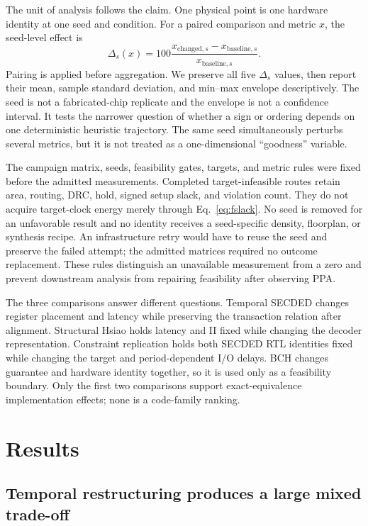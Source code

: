 \documentclass[conference,10pt]{IEEEtran}
\begin{document}
The unit of analysis follows the claim. One physical point is one hardware identity at one seed and condition. For a paired comparison and metric $x$, the seed-level effect is
\begin{equation}
 \Delta_s(x)=100\frac{x_{\mathrm{changed},s}-x_{\mathrm{baseline},s}}
 {x_{\mathrm{baseline},s}} .
 \label{eq:paired}
\end{equation}
Pairing is applied before aggregation. We preserve all five $\Delta_s$ values, then report their mean, sample standard deviation, and min--max envelope descriptively. The seed is not a fabricated-chip replicate and the envelope is not a confidence interval. It tests the narrower question of whether a sign or ordering depends on one deterministic heuristic trajectory. The same seed simultaneously perturbs several metrics, but it is not treated as a one-dimensional ``goodness'' variable.

The campaign matrix, seeds, feasibility gates, targets, and metric rules were fixed before the admitted measurements. Completed target-infeasible routes retain area, routing, DRC, hold, signed setup slack, and violation count. They do not acquire target-clock energy merely through Eq.~\eqref{eq:fslack}. No seed is removed for an unfavorable result and no identity receives a seed-specific density, floorplan, or synthesis recipe. An infrastructure retry would have to reuse the seed and preserve the failed attempt; the admitted matrices required no outcome replacement. These rules distinguish an unavailable measurement from a zero and prevent downstream analysis from repairing feasibility after observing PPA.

The three comparisons answer different questions. Temporal SECDED changes register placement and latency while preserving the transaction relation after alignment. Structural Hsiao holds latency and II fixed while changing the decoder representation. Constraint replication holds both SECDED RTL identities fixed while changing the target and period-dependent I/O delays. BCH changes guarantee and hardware identity together, so it is used only as a feasibility boundary. Only the first two comparisons support exact-equivalence implementation effects; none is a code-family ranking.

\section{Results}

\subsection{Temporal restructuring produces a large mixed trade-off}
\end{document}
